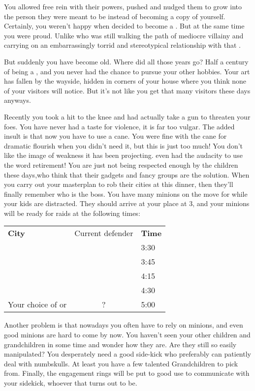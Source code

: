 \documentclass[char]{LRSguildcamp1}
\begin{document}
You allowed \cYoungest{} free rein with their powers, pushed and nudged them to grow into the person they were meant to be instead of becoming a copy of yourself. Certainly, you weren't happy when \cYoungest{} decided to become a \cYoungest{\hero}. But at the same time you were proud. Unlike \cOldest{} who was still walking the path of mediocre villainy and carrying on an embarrassingly torrid and stereotypical relationship with that \cOS{\hero}. 

But suddenly you have become old. Where did all those years go? Half a century of being a \cGrandma{\villain}, and you never had the chance to pursue your other hobbies. Your art has fallen by the wayside, hidden in corners of your house where you think none of your visitors will notice. But it's not like you get that many visitors these days anyways.

Recently you took a hit to the knee and had actually take a gun to threaten your foes. You have never had a taste for violence, it is far too vulgar. The added insult is that now you have to use a cane. You were fine with the cane for dramatic flourish when you didn't need it, but this is just too much! You don't like the image of weakness it has been projecting. \cOldest{} even had the audacity to use the word retirement! You are just not being respected enough by the children these days,who think that their gadgets and fancy groups are the solution. When you carry out your masterplan to rob their cities at this dinner, then they'll finally remember who is the boss.  You have many minions on the move for while your kids are distracted.  They should arrive at your place at 3, and your minions will be ready for raids at the following times:

\begin{tabular}{|l|c|l|}
{\bf City} & Current defender & {\bf Time} \\
\pCityYoungest{} & \cYoungest{} & 3:30 \\
\pCityO{} & \cOldest{} & 3:45 \\
\pCityYoungest{} & \cYoungest{} & 4:15 \\
\pCityO{} & \cOldest{} & 4:30 \\
Your choice of \pCityYoungest{} or \pCityO{} & ? & 5:00
\end{tabular}

Another problem is that nowadays you often have to rely on minions, and even good minions are hard to come by now. You haven't seen your other children and grandchildren in some time and wonder how they are. Are they still so easily manipulated? You desperately need a good side-kick who preferably can patiently deal with numbskulls.  At least you have a few talented Grandchildren to pick from. Finally, the engagement rings will be put to good use to communicate with your sidekick, whoever that turns out to be. 
\end{document}
